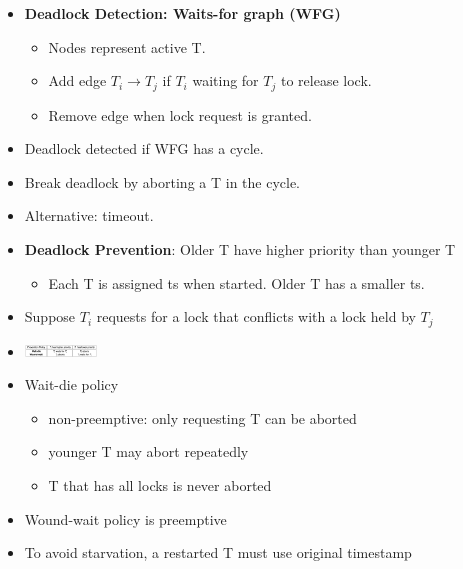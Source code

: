 \documentclass[8pt, landscape]{extarticle}
\begin{document}
\begin{multicols*}{4}
  \begin{itemize}
    \item \textbf{Deadlock Detection: Waits-for graph (WFG)}
    \begin{itemize}
      \item Nodes represent active T.
      \item Add edge $T_i \rightarrow T_j$ if $T_i$ waiting for $T_j$ to release lock.
      \item Remove edge when lock request is granted.
    \end{itemize}
    \item Deadlock detected if WFG has a cycle.
    \item Break deadlock by aborting a T in the cycle.
    \item Alternative: timeout.
  \end{itemize}
  \begin{itemize}
    \item \textbf{Deadlock Prevention}: Older T have higher priority than younger T
    \begin{itemize}
      \item Each T is assigned ts when started. Older T has a smaller ts.
    \end{itemize}
    \item Suppose $T_i$ requests for a lock that conflicts with a lock held by $T_j$
    \item \includegraphics[width=0.15\textwidth]{cs3223-deadlock-prevention.png}
    \item Wait-die policy
    \begin{itemize}
      \item non-preemptive: only requesting T can be aborted
      \item younger T may abort repeatedly
      \item T that has all locks is never aborted
    \end{itemize}
    \item Wound-wait policy is preemptive
    \item To avoid starvation, a restarted T must use original timestamp
  \end{itemize}


\end{multicols*}
\end{document}
